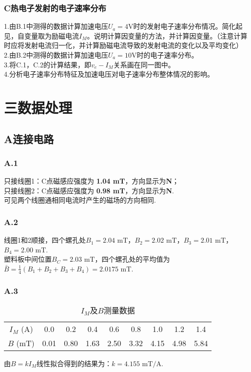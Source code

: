 \documentclass{ctexart}
\begin{document}
\subsubsection*{C\quad 热电子发射的电子速率分布}
\noindent 1.由B.1中测得的数据计算加速电压$U_a=4\mathrm{V}$时的发射电子速率分布情况。简化起见，自变量取为励磁电流$I_M$。说明计算因变量的方法，并计算因变量。（注意计算时应将发射电流归一化，并计算励磁电流导致的发射电流的变化以及平均变化）\\ 
\noindent 2.由B.2中测得的数据计算加速电压$U_a=10\mathrm{V}$时的电子速率分布。\\
\noindent 3.将C.1，C.2的计算结果，即$v_e-I_M$关系画在同一图中。\\
\noindent 4.分析电子速率分布特征及加速电压对电子速率分布整体情况的影响。

\section*{三\quad 数据处理}

\subsection*{A\quad 连接电路}
\subsubsection*{A.1}
\noindent 只接线圈1：C点磁感应强度为 \textbf{1.04 mT}，方向显示为\textbf{N}；\\
\noindent 只接线圈2：C点磁感应强度为 \textbf{0.98 mT}，方向显示为\textbf{N}.\\
\noindent 可见两个线圈通相同电流时产生的磁场的方向相同.
\subsubsection*{A.2}
\noindent 线圈1和2顺接，四个螺孔处$B_1=2.04$  $\mathrm{mT}$，$B_2=2.02$  $\mathrm{mT}$，$B_3=2.01$  $\mathrm{mT}$，$B_4=2.00$  $\mathrm{mT}$.\\
\noindent 塑料板中间位置$B_C=2.03$  $\mathrm{mT}$，四个螺孔处的平均值为$\bar{B}=\frac{1}{4}(B_1+B_2+B_3+B_4)=2.0175$  $\mathrm{mT}$.
\clearpage
\subsubsection*{A.3}
\begin{table}[H]
  \caption{$I_M$及$B$测量数据} \vspace{0.2em}
  \centering
  {
  \begin{tabular}{c|cccccccc}
    \hline
    $I_M$ (A)& 0.0 & 0.2 & 0.4 & 0.6 & 0.8 & 1.0 & 1.2& 1.4\\
    $B$ (mT)&  0.01& 0.80& 1.63& 2.50& 3.32& 4.15& 4.98& 5.84\\
    \hline
    \end{tabular}}
\end{table}
\noindent 由$B=kI_M$线性拟合得到的结果为：$k=4.155$   $\mathrm{mT/A}$.
\end{document}
